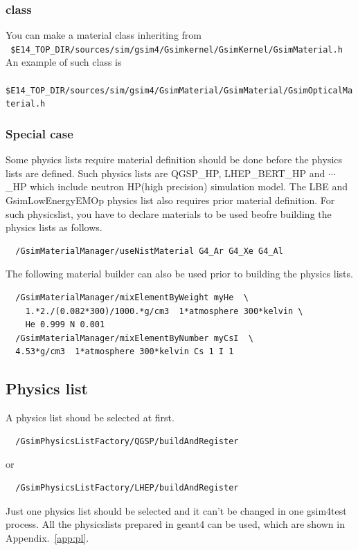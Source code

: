 \documentclass[a4paper,12pt]{article}
\begin{document}
 \subsubsection{class}
 You can make a material class inheriting from\\
 {\tt
 \$E14\_TOP\_DIR/sources/sim/gsim4/Gsimkernel/GsimKernel/GsimMaterial.h}\\
 An example of such class is \\
 {\tt
 \$E14\_TOP\_DIR/sources/sim/gsim4/GsimMaterial/GsimMaterial/GsimOpticalMaterial.h}
 \subsubsection{Special case}
 Some physics lists require material definition should be done before the
 physics lists are defined. Such physics lists are
 QGSP\_HP, LHEP\_BERT\_HP and $\cdots$\_HP which include 
 neutron HP(high precision)  simulation model.
 The LBE and GsimLowEnergyEMOp physics list also requires prior material
 definition. For such physicslist, 
 you have to declare materials to be used beofre building the physics
 lists as follows. 
 \begin{screen}
  \begin{verbatim}
  /GsimMaterialManager/useNistMaterial G4_Ar G4_Xe G4_Al\end{verbatim}
 \end{screen}
 The following material builder can also be used prior to
 building the physics lists. 
 \begin{screen}
  \begin{verbatim}
  /GsimMaterialManager/mixElementByWeight myHe  \ 
    1.*2./(0.082*300)/1000.*g/cm3  1*atmosphere 300*kelvin \
    He 0.999 N 0.001
  /GsimMaterialManager/mixElementByNumber myCsI  \ 
  4.53*g/cm3  1*atmosphere 300*kelvin Cs 1 I 1\end{verbatim}
 \end{screen}
 \subsection{Physics list}
 A physics list shoud be selected at first.
 \begin{screen}
  \begin{verbatim}
  /GsimPhysicsListFactory/QGSP/buildAndRegister \end{verbatim}
 \end{screen}
 or
 \begin{screen}
  \begin{verbatim}
  /GsimPhysicsListFactory/LHEP/buildAndRegister \end{verbatim}
 \end{screen}
 Just one physics list should be selected and
 it can't be changed in one gsim4test process.
 All the physicslists prepared in geant4 can be used, which are shown in
 Appendix.~\ref{app:pl}.
\end{document}
